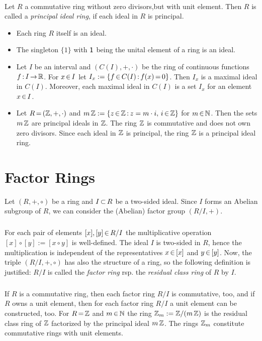 \documentclass[11pt,twoside]{article}
\begin{document}
\paragraph{} %
Let $R$ a commutative ring without zero divisors,but with unit element.
Then $R$ is called a \textit{principal ideal ring},
if each ideal in $R$ is principal.

\begin{itemize}[leftmargin=15pt]
\item[1.]
Each ring $R$ itself is an ideal.

\item[2.]
The singleton $\{1\}$ with ${\mathsf{1}}$ being the unital element of a ring is an ideal.

\item[3.]
Let $I$ be an interval
and $(C(I),+,\cdot)$ be the ring of continuous functions $f {\,:\,}I {\,\to\,} {\mathbb{R}}$.
For $x {\,\in\,} I$ let $I_x := \{f {\,\in\,} C(I) {\,:\,} f(x) {\,=\,} 0 \}$.
Then $I_x$ is a maximal ideal in $C(I)$.
Moreover,
each maximal ideal in $C(I)$ is a set $I_x$ for an element $x {\,\in\,} I$.

\item[4.]
Let $R {\,=\,} ({\mathbb{Z}},+,\cdot)$ and 
$m \, {\mathbb{Z}} := \{z {\,\in\,} {\mathbb{Z}} {\,:\,} z = m \cdot i, \, i {\,\in\,} {\mathbb{Z}} \}$ for $m {\,\in\,} {\mathbb{N}}$.
Then the sets $m \, {\mathbb{Z}}$ are principal ideals in ${\mathbb{Z}}$.
The ring ${\mathbb{Z}}$ is commutative and does not own zero divisors.
Since each ideal in ${\mathbb{Z}}$ is principal, 
the ring ${\mathbb{Z}}$ is a principal ideal ring.
\end{itemize}

\section{Factor Rings}
Let $(R,+,\circ)$ be a ring and $I {\,\subset\,} R$ be a two-sided ideal. 
Since $I$ forms an Abelian subgroup of $R$,
we can consider the (Abelian) factor group $(R/I,+)$.

\subparagraph{}
For each pair of elements $[x],[y] {\,\in\,} R/I$ the multiplicative operation
$[x] \circ [y] := [x \circ y]$ is well-defined.
The ideal $I$ is two-sided in $R$,
hence the multiplication is independent of the representatives
$x {\,\in\,} [x]$ and $y {\,\in\,} [y]$.
Now,
the triple $(R/I,+,\circ)$ has also the structure of a ring,
so the following definition is justified:
$R/I$ is called the \textit{factor ring} rsp.
the \textit{residual class ring} of $R$ by $I$.

\subparagraph{}
If $R$ is a commutative ring,
then each factor ring $R/I$ is commutative, too,
and if $R$ owns a unit element, 
then for each factor ring $R/I$ a unit element can be constructed, too. 
For $R {\,=\,} {\mathbb{Z}}$ and $m {\,\in\,} {\mathbb{N}}$ the ring ${\mathbb{Z}}_m := {\mathbb{Z}} / (m \, {\mathbb{Z}})$
is the residual class ring of ${\mathbb{Z}}$ factorized by the principal ideal $m \, {\mathbb{Z}}$.
The rings ${\mathbb{Z}}_m$ constitute commutative rings with unit elements.
\end{document}
